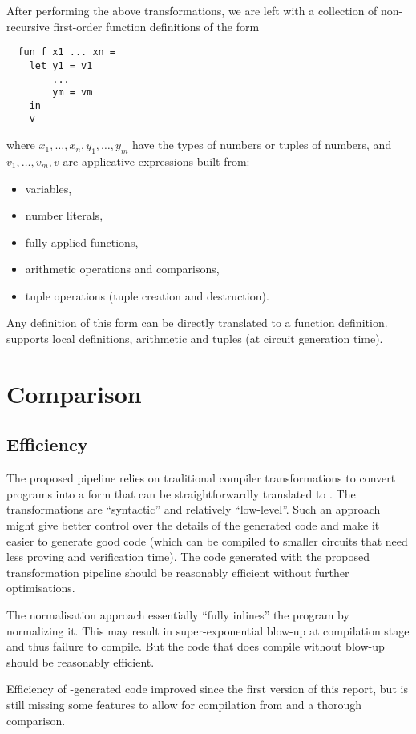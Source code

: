 \documentclass[final]{msc}
\begin{document}
After performing the above transformations, we are left with a
collection of non-recursive first-order function definitions of the
form
\begin{verbatim}
  fun f x1 ... xn =
    let y1 = v1
        ...
        ym = vm
    in
    v
\end{verbatim}
where $x_1,\ldots,x_n,y_1,\ldots,y_m$ have the types of numbers or
tuples of numbers, and $v_1,\ldots,v_m,v$ are applicative
expressions built from:
\begin{itemize}
\item variables,
\item number literals,
\item fully applied functions,
\item arithmetic operations and comparisons,
\item tuple operations (tuple creation and destruction).
\end{itemize}
Any definition of this form can be directly translated to a \VampIR{}
function definition. \VampIR{} supports local definitions, arithmetic and
tuples (at circuit generation time).

\section{Comparison}\label{sec_comparison}

\subsection{Efficiency}

The proposed pipeline relies on traditional compiler transformations
to convert \Juvix{} programs into a form that can be straightforwardly
translated to \VampIR{}. The transformations are ``syntactic'' and
relatively ``low-level''. Such an approach might give better control
over the details of the generated \VampIR{} code and make it easier to
generate good \VampIR{} code (which can be compiled to
smaller circuits that need less proving and verification time). The code generated with the proposed
transformation pipeline should be reasonably efficient without further
optimisations.

The normalisation approach essentially ``fully inlines'' the program
by normalizing it. This may result in super-exponential blow-up at
compilation stage and thus failure to compile. But the code that does
compile without blow-up should be reasonably efficient.

Efficiency of \Geb{}-generated code improved since the first version of this report, but
\Geb{} is still missing some features to allow for compilation from \Juvix{} and a thorough comparison.
\end{document}

